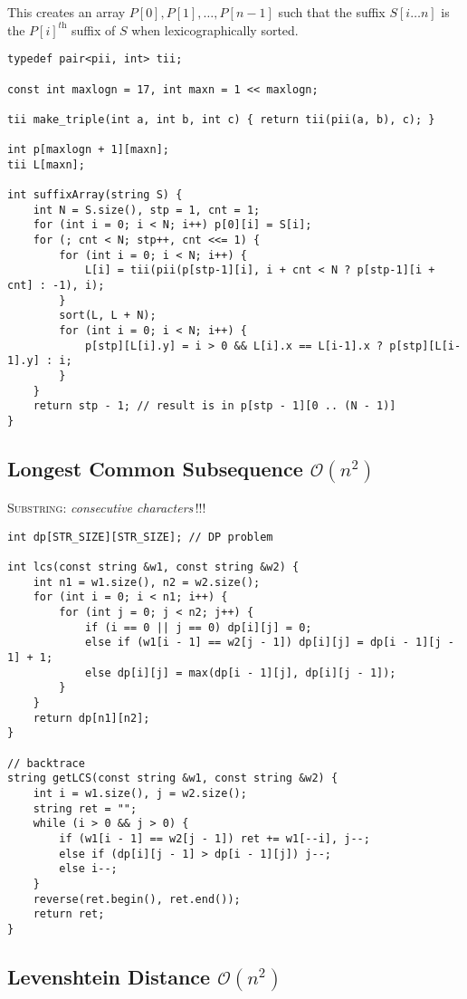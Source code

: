 \documentclass[8pt,a4paper,landscape,oneside]{amsart}
\begin{document}
\begin{multicols*}{3}
This creates an array $P[0], P[1], \dots, P[n-1]$ such that the suffix $S[i \dots n]$ is the $P[i]^\textit{th}$ suffix of $S$ when lexicographically sorted.

\begin{lstlisting}
typedef pair<pii, int> tii;

const int maxlogn = 17, int maxn = 1 << maxlogn;

tii make_triple(int a, int b, int c) { return tii(pii(a, b), c); }

int p[maxlogn + 1][maxn];
tii L[maxn];

int suffixArray(string S) {
	int N = S.size(), stp = 1, cnt = 1;
	for (int i = 0; i < N; i++) p[0][i] = S[i];
	for (; cnt < N; stp++, cnt <<= 1) {
		for (int i = 0; i < N; i++) {
			L[i] = tii(pii(p[stp-1][i], i + cnt < N ? p[stp-1][i + cnt] : -1), i);
		}
		sort(L, L + N);
		for (int i = 0; i < N; i++) {
			p[stp][L[i].y] = i > 0 && L[i].x == L[i-1].x ? p[stp][L[i-1].y] : i;
		}
	}
	return stp - 1; // result is in p[stp - 1][0 .. (N - 1)]
}
\end{lstlisting}

\subsection{Longest Common Subsequence $\mathcal{O}(n^{2})$}
\textsc{Substring}: \textit{consecutive characters}\,!!!

\begin{lstlisting}
int dp[STR_SIZE][STR_SIZE]; // DP problem

int lcs(const string &w1, const string &w2) {
	int n1 = w1.size(), n2 = w2.size();
	for (int i = 0; i < n1; i++) {
		for (int j = 0; j < n2; j++) {
			if (i == 0 || j == 0) dp[i][j] = 0;
			else if (w1[i - 1] == w2[j - 1]) dp[i][j] = dp[i - 1][j - 1] + 1;
			else dp[i][j] = max(dp[i - 1][j], dp[i][j - 1]);
		}
	}
	return dp[n1][n2];
}

// backtrace
string getLCS(const string &w1, const string &w2) {
	int i = w1.size(), j = w2.size();
	string ret = "";
	while (i > 0 && j > 0) {
		if (w1[i - 1] == w2[j - 1]) ret += w1[--i], j--;
		else if (dp[i][j - 1] > dp[i - 1][j]) j--;
		else i--;
	}
	reverse(ret.begin(), ret.end());
	return ret;
}
\end{lstlisting}

\subsection{Levenshtein Distance $\mathcal{O}(n^{2})$}


\end{multicols*}
\end{document}
